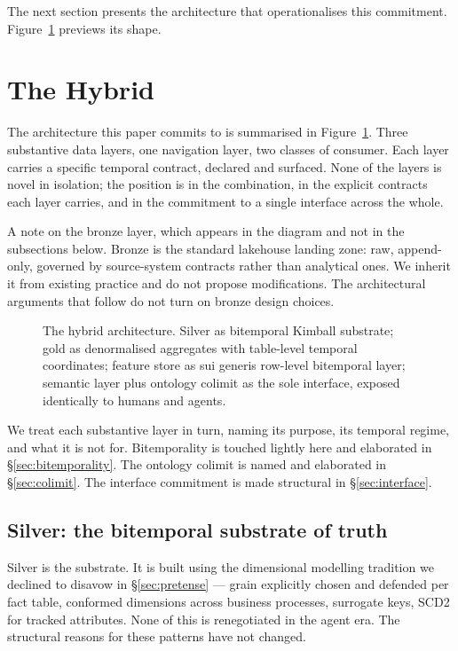 \documentclass[11pt,a4paper]{article}
\begin{document}
The next section presents the architecture that operationalises this commitment. Figure~\ref{fig:architecture} previews its shape.

\section{The Hybrid}
\label{sec:hybrid}

The architecture this paper commits to is summarised in Figure~\ref{fig:architecture}. Three substantive data layers, one navigation layer, two classes of consumer. Each layer carries a specific temporal contract, declared and surfaced. None of the layers is novel in isolation; the position is in the combination, in the explicit contracts each layer carries, and in the commitment to a single interface across the whole.

A note on the bronze layer, which appears in the diagram and not in the subsections below. Bronze is the standard lakehouse landing zone: raw, append-only, governed by source-system contracts rather than analytical ones. We inherit it from existing practice and do not propose modifications. The architectural arguments that follow do not turn on bronze design choices.

\begin{figure}[h]
  \centering
  
  \caption{The hybrid architecture. Silver as bitemporal Kimball substrate; gold as denormalised aggregates with table-level temporal coordinates; feature store as sui generis row-level bitemporal layer; semantic layer plus ontology colimit as the sole interface, exposed identically to humans and agents.}
  \label{fig:architecture}
\end{figure}

We treat each substantive layer in turn, naming its purpose, its temporal regime, and what it is not for. Bitemporality is touched lightly here and elaborated in \S\ref{sec:bitemporality}. The ontology colimit is named and elaborated in \S\ref{sec:colimit}. The interface commitment is made structural in \S\ref{sec:interface}.

\subsection{Silver: the bitemporal substrate of truth}

Silver is the substrate. It is built using the dimensional modelling tradition we declined to disavow in \S\ref{sec:pretense} --- grain explicitly chosen and defended per fact table, conformed dimensions across business processes, surrogate keys, SCD2 for tracked attributes. None of this is renegotiated in the agent era. The structural reasons for these patterns have not changed.
\end{document}
